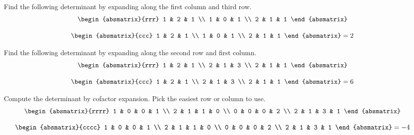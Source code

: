 \begin{enumialphparenastyle}
\begin{ex} Find the following determinant by expanding along the first column and
third row. 
\begin{equation*}
\begin{absmatrix}{rrr}
1 & 2 & 1 \\
1 & 0 & 1 \\
2 & 1 & 1
\end{absmatrix}
\end{equation*}
\begin{sol}
\[
\begin{absmatrix}{ccc}
1 & 2 & 1 \\
1 & 0 & 1 \\
2 & 1 & 1
\end{absmatrix} =  2
\]
\end{sol}
\end{ex}

\begin{ex} Find the following determinant by expanding along the second row and
first column. 
\begin{equation*}
\begin{absmatrix}{rrr}
1 & 2 & 1 \\
2 & 1 & 3 \\
2 & 1 & 1
\end{absmatrix}
\end{equation*}
\begin{sol}
\[
\begin{absmatrix}{ccc}
1 & 2 & 1 \\
2 & 1 & 3 \\
2 & 1 & 1
\end{absmatrix} = 6
\]
\end{sol}
\end{ex}

\begin{ex} Compute the determinant by cofactor expansion. Pick the easiest row or
column to use.
\begin{equation*}
\begin{absmatrix}{rrrr}
1 & 0 & 0 & 1 \\
2 & 1 & 1 & 0 \\
0 & 0 & 0 & 2 \\
2 & 1 & 3 & 1
\end{absmatrix}
\end{equation*}
\begin{sol}
\[
\begin{absmatrix}{cccc}
1 & 0 & 0 & 1 \\
2 & 1 & 1 & 0 \\
0 & 0 & 0 & 2 \\
2 & 1 & 3 & 1
\end{absmatrix} = -4
\]
\end{sol}
\end{ex}

\end{enumialphparenastyle}